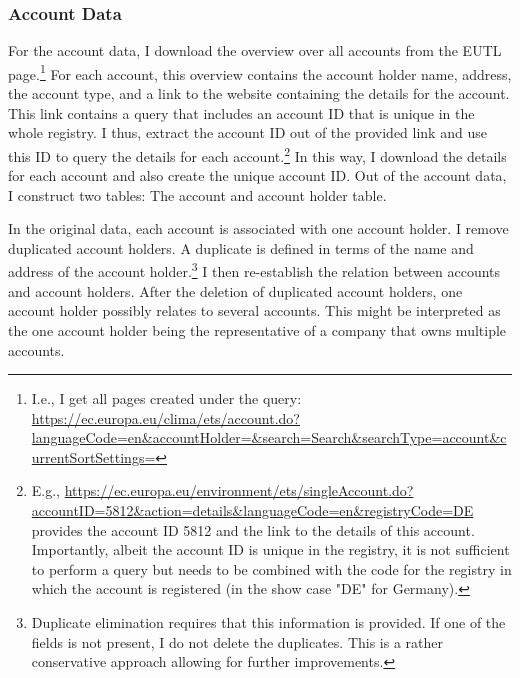 \documentclass[authoryear]{elsarticle}
\begin{document}
\subsubsection{Account Data}	
For the account data, I download the overview over all accounts from the EUTL page.\footnote{I.e., I get all pages created under the query: \url{https://ec.europa.eu/clima/ets/account.do?languageCode=en&accountHolder=&search=Search&searchType=account&currentSortSettings=}} For each account, this overview contains the account holder name, address, the account type, and a link to the website containing the details for the account. This link contains a query that includes an account ID that is unique in the whole registry. I thus, extract the  account ID out of the provided link and use this ID to query the details for each account.\footnote{E.g., \url{https://ec.europa.eu/environment/ets/singleAccount.do?accountID=5812&action=details&languageCode=en&registryCode=DE} provides the account ID 5812 and the link to the details of this account. Importantly, albeit the account ID is unique in the registry, it is not sufficient to perform a query but needs to be combined with the code for the registry in which the account is registered (in the show case "DE" for Germany).} In this way, I download the details for each account and also create the unique account ID. Out of the account data, I construct two tables: The account and account holder table.

In the original data, each account is associated with one account holder. I remove duplicated account holders. A duplicate is defined in terms of the name and address of the account holder.\footnote{Duplicate elimination requires that this information is provided. If one of the fields is not present, I do not delete the duplicates. This is a rather conservative approach allowing for further improvements.} I then re-establish the relation between accounts and account holders. After the deletion of duplicated account holders, one account holder possibly relates to several accounts. This might be interpreted as the one account holder being the representative of a company that owns multiple accounts.
\end{document}
